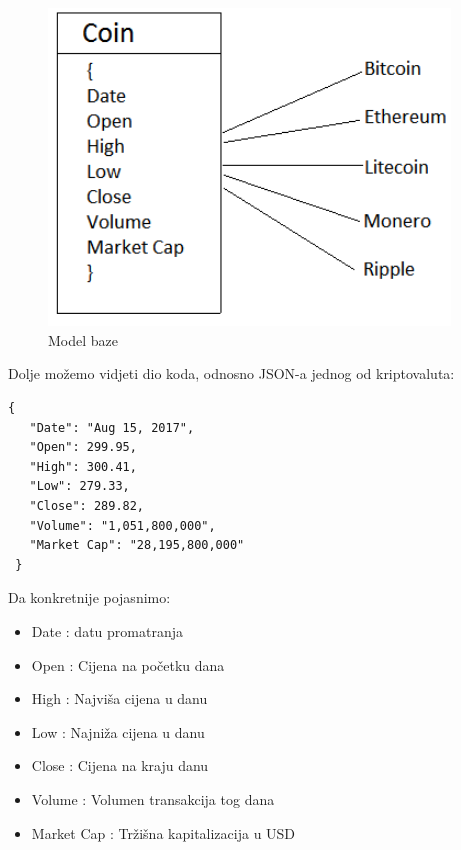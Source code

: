\documentclass[a4paper,12pt]{foi}
\begin{document}
\begin{figure}[h]
\centering 
\includegraphics[width=0.95\textwidth]{model.png}
\caption{Model baze}
\label{slika-2}
\end{figure}

Dolje možemo vidjeti dio koda, odnosno JSON-a jednog od kriptovaluta:
\lstset{commentstyle=\textit,language=python}
\begin{lstlisting}[frame=tb]
{
   "Date": "Aug 15, 2017",
   "Open": 299.95,
   "High": 300.41,
   "Low": 279.33,
   "Close": 289.82,
   "Volume": "1,051,800,000",
   "Market Cap": "28,195,800,000"
 }
\end{lstlisting}

Da konkretnije pojasnimo:
\begin{itemize}
\item Date : datu promatranja
\item Open : Cijena na početku dana
\item High : Najviša cijena u danu
\item Low : Najniža cijena u danu
\item Close : Cijena na kraju danu
\item Volume : Volumen transakcija tog dana
\item Market Cap : Tržišna kapitalizacija u USD
\end{itemize}
\end{document}
